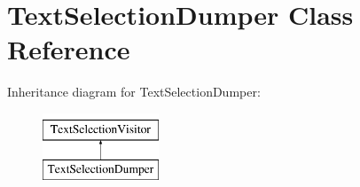 \hypertarget{class_text_selection_dumper}{}\section{Text\+Selection\+Dumper Class Reference}
\label{class_text_selection_dumper}
Inheritance diagram for Text\+Selection\+Dumper\+:\begin{figure}[H]
\begin{center}
\leavevmode
\includegraphics[height=2.000000cm]{class_text_selection_dumper}
\end{center}
\end{figure}
